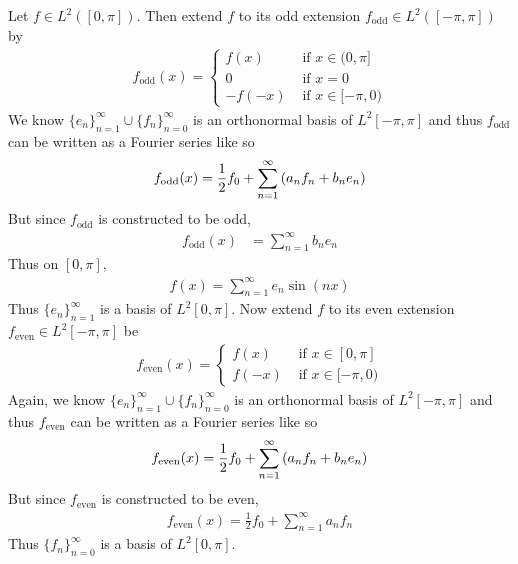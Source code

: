 \documentclass[12pt]{article}
\theoremstyle{plain}
\begin{document}
Let $f \in L^2([0, \pi])$.  Then extend $f$ to its odd extension $f_{\text{odd}} \in L^2([-\pi, \pi])$ by
\begin{align*}
    f_{\text{odd}}(x) = \begin{cases}
        f(x) & \text{ if } x \in (0, \pi] \\
        0 & \text{ if } x = 0 \\
        -f(-x) & \text{ if } x \in [-\pi, 0)
    \end{cases}
\end{align*}
We know $\{e_n\}_{n=1}^\infty \cup \{f_n\}_{n=0}^\infty$ is an orthonormal basis of $L^2[-\pi, \pi]$ and thus $f_{\text{odd}}$ can be written as a Fourier series like so
\begin{align*}
    f_{\text{odd}}(x) = \frac{1}{2}f_0 + \sum_{n=1}^\infty\qty(a_nf_n + b_ne_n)
\end{align*}
But since $f_{\text{odd}}$ is constructed to be odd,
\begin{align*}
    f_{\text{odd}}(x) &= \sum_{n=1}^\infty b_ne_n
\end{align*}
Thus on $[0, \pi]$,
\begin{align*}
    f(x) = \sum_{n=1}^\infty e_n\sin(nx)
\end{align*}
Thus $\{e_n\}_{n=1}^\infty$ is a basis of $L^2[0, \pi]$.  Now extend $f$ to its even extension $f_{\text{even}} \in L^2[-\pi, \pi]$ be
\begin{align*}
    f_{\text{even}}(x) = \begin{cases}
        f(x) & \text{ if } x \in [0, \pi] \\
        f(-x) & \text{ if } x \in [-\pi, 0)
    \end{cases}
\end{align*}
Again, we know $\{e_n\}_{n=1}^\infty \cup \{f_n\}_{n=0}^\infty$ is an orthonormal basis of $L^2[-\pi, \pi]$ and thus $f_{\text{even}}$ can be written as a Fourier series like so
\begin{align*}
    f_{\text{even}}(x) = \frac{1}{2}f_0 + \sum_{n=1}^\infty\qty(a_nf_n + b_ne_n)
\end{align*}
But since $f_{\text{even}}$ is constructed to be even,
\begin{align*}
    f_{\text{even}}(x) = \frac{1}{2}f_0 + \sum_{n=1}^\infty a_nf_n
\end{align*}
Thus $\{f_n\}_{n=0}^\infty$ is a basis of $L^2[0, \pi]$.
\end{document}
